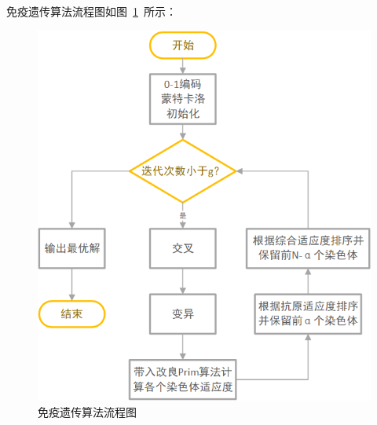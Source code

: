\documentclass{whutmod}
\begin{document}
	  \newpage
	  免疫遗传算法流程图如图~\ref{bgrs}~所示：
	  \begin{figure}[H]
		\centering
		 \includegraphics[width=.6\textwidth]{figures/a31.png}
		 \caption{	免疫遗传算法流程图}\label{bgrs}
	 \end{figure}
\end{document}
